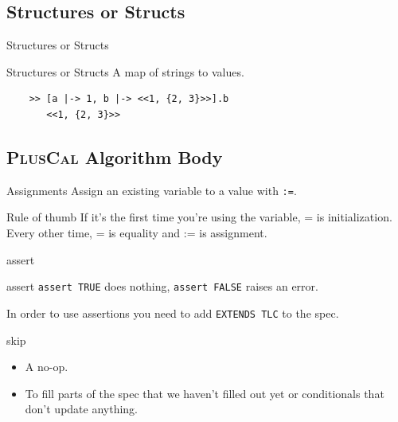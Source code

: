 \documentclass[10pt]{beamer}
\newcommand{\pluscal}{\textbf{\textsc{PlusCal}}\xspace}
\begin{document}
\subsection{Structures or Structs}

\begin{frame}[fragile]{Structures or Structs}

  \begin{exampleblock}{Structures or Structs}
    A \alert{map} of strings to values.
  \end{exampleblock}

  \begin{verbatim}
    >> [a |-> 1, b |-> <<1, {2, 3}>>].b
       <<1, {2, 3}>>
  \end{verbatim}
\end{frame}

\subsection{\pluscal Algorithm Body}

\begin{frame}{Assignments}
  Assign an \alert{existing} variable to a value with \texttt{:=}.

  \begin{alertblock}{Rule of thumb}
    If it's the first time you're using the variable, = is initialization. Every other time, = is equality and := is assignment.
  \end{alertblock}
\end{frame}

\begin{frame}{assert}
  \begin{exampleblock}{assert}
    \texttt{assert TRUE} does nothing, \texttt{assert FALSE} raises an error.
  \end{exampleblock}
  In order to use assertions you need to add \texttt{EXTENDS TLC} to the spec.
\end{frame}

\begin{frame}{skip}
  \begin{itemize}
    \item A \alert{no-op}.
    \item To fill parts of the spec that we haven't filled out yet or conditionals that don't update anything.
  \end{itemize}
\end{frame}
\end{document}
